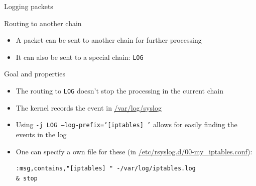 \begin{reveals}
\begin{frame}[c,fragile]{Logging packets}
  
  \begin{block}{Routing to another chain}
    \begin{itemize}
    \item A packet can be sent to another chain for further processing
    \item It can also be sent to a special chain: \texttt{LOG}
    \end{itemize}
  \end{block}

  \vfill

  \begin{block}{Goal and properties}
    \begin{itemize}
    \item The routing to \texttt{LOG} doesn't stop the processing in
      the current chain
    \item The kernel records the event in \url{/var/log/syslog}
    \item Using \texttt{-j LOG --log-prefix='[iptables] '} allows for
      easily finding the events in the log
    \item One can specify a own file for these (in \url{/etc/rsyslog.d/00-my\_iptables.conf}):
\begin{verbatim}
:msg,contains,"[iptables] " -/var/log/iptables.log
& stop
\end{verbatim}
    \end{itemize}
  \end{block}

\end{frame}


\end{reveals}
